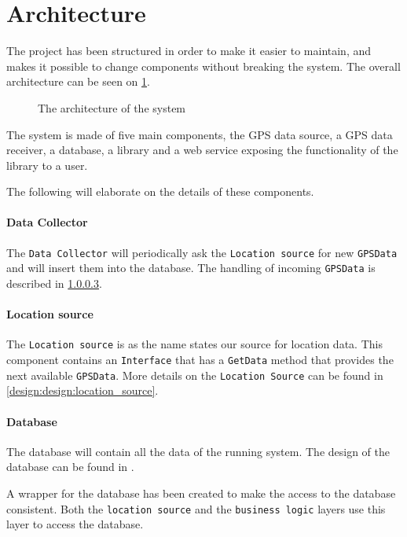 \section{Architecture}

The project has been structured in order to make it easier to maintain, and makes it possible to change components without breaking the system.
The overall architecture can be seen on \cref{arch}.

\begin{figure}[h]
\center

\caption{The architecture of the system}
\label{arch}
\end{figure}

The system is made of five main components, the GPS data source, a GPS data receiver, a database, a library and a web service exposing the functionality of the library to a user.

The following will elaborate on the details of these components.

\paragraph{Data Collector}
The \texttt{Data Collector} will periodically ask the \texttt{Location source} for new \texttt{GPSData} and will insert them into the database. 
The handling of incoming \texttt{GPSData} is described in  \cref{}.

\paragraph{Location source}
The \texttt{Location source} is as the name states our source for location data.
This component contains an \texttt{Interface} that has a \texttt{GetData} method that provides the next available \texttt{GPSData}.
More details on the \texttt{Location Source} can be found in \cref{design:design:location_source}.


\paragraph{Database}
The database will contain all the data of the running system.
The design of the database can be found in .

A wrapper for the database has been created to make the access to the database consistent. 
Both the \texttt{location source} and the \texttt{business logic} layers use this layer to access the database.

